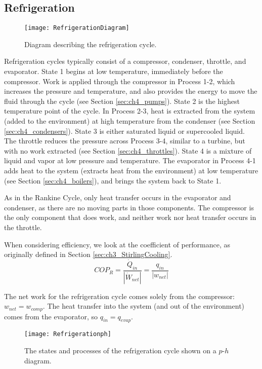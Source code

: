 \subsection{Refrigeration}
\begin{figure}[H]
\centering
\texttt{[image: RefrigerationDiagram]}
\caption{Diagram describing the refrigeration cycle.}
\label{fig:ch4_RefrigerationCycle}
\end{figure}

Refrigeration cycles typically consist of a compressor, condenser, throttle, and evaporator.  State 1 begins at low temperature, immediately before the compressor.  Work is applied through the compressor in Process 1-2, which increases the pressure and temperature, and also provides the energy to move the fluid through the cycle (see Section \ref{sec:ch4_pumps}).  State 2 is the highest temperature point of the cycle.  In Process 2-3, heat is extracted from the system (added to the environment) at high temperature from the condenser (see Section \ref{sec:ch4_condensers}).  State 3 is either saturated liquid or supercooled liquid.  The throttle reduces the pressure across Process 3-4, similar to a turbine, but with no work extracted (see Section \ref{sec:ch4_throttles}).  State 4 is a mixture of liquid and vapor at low pressure and temperature.  The evaporator in Process 4-1 adds heat to the system (extracts heat from the environment) at low temperature (see Section \ref{sec:ch4_boilers}), and brings the system back to State 1.

As in the Rankine Cycle, only heat transfer occurs in the evaporator and condenser, as there are no moving parts in those components.  The compressor is the only component that does work, and neither work nor heat transfer occurs in the throttle.

When considering efficiency, we look at the coefficient of performance, as originally defined in Section \ref{sec:ch3_StirlingCooling}.
\begin{equation*}
  COP_R = \frac{\dot{Q}_{in}}{|\dot{W}_{net}|} = \frac{q_{in}}{|w_{net}|}
\end{equation*}

The net work for the refrigeration cycle comes solely from the compressor: $w_{net} = w_{comp}$.  The heat transfer into the system (and out of the environment) comes from the evaporator, so $q_{in} = q_{evap}$.

\begin{figure}[H]
\centering
\texttt{[image: Refrigerationph]}
\caption{The states and processes of the refrigeration cycle shown on a $p$-$h$ diagram.}
\label{fig:ch4_Refrigerationph}
\end{figure}

